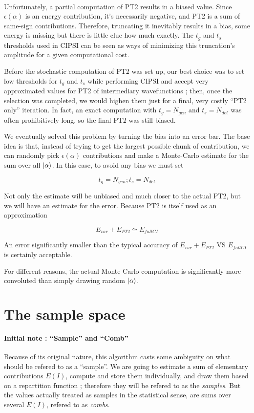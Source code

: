 \documentclass[./thesis.tex]{subfiles}
\begin{document}
\paragraph{}

Unfortunately, a partial computation of PT2 results in a biased value. Since $\epsilon(\alpha)$ is an energy contribution, it's necessarily negative, and PT2 is a sum of same-sign contributions. Therefore, truncating it inevitably results in a bias, some energy is missing but there is little clue how much exactly. The $t_g$ and $t_s$ thresholds used in CIPSI can be seen as ways of minimizing this truncation's amplitude for a given computational cost.

Before the stochastic computation of PT2 was set up, our best choice was to set low thresholds for $t_g$ and $t_s$ while performing CIPSI and accept very approximated values for PT2 of intermediary wavefunctions ; then, once the selection was completed, we would highen them just for a final, very costly ``PT2 only'' iteration. In fact, an exact computation with $t_g=N_{gen}$ and $t_s=N_{det}$ was often prohibitively long, so the final PT2 was still biased. 


We eventually solved this problem by turning the bias into an error bar. The base idea is that, instead of trying to get the largest possible chunk of contribution, we can randomly pick $\epsilon(\alpha)$ contributions and make a Monte-Carlo estimate for the sum over all $\ket \alpha$. In this case, to avoid any bias we must set

$$t_g = N_{gen} ; t_s = N_{det}$$

Not only the estimate will be unbiased and much closer to the actual PT2, but we will have an estimate for the error. Because PT2 is itself used as an approximation

$$E_{var} + E_{PT2} \simeq E_{fullCI}$$

An error significantly smaller than the typical accuracy of $E_{var} + E_{PT2}$ VS $E_{fullCI}$ is certainly acceptable.


For different reasons, the actual Monte-Carlo computation is significantly more convoluted than simply drawing random $\ket \alpha$.


\section{The sample space}


\paragraph{Initial note : ``Sample'' and ``Comb''}
Because of its original nature, this algorithm casts some ambiguity on what should be refered to as a ``sample''. We are going to estimate a sum of elementary contributions $E(I)$, compute and store them individually, and draw them based on a repartition function ; therefore they will be refered to as the \emph{samples}. But the values actually treated as samples in the statistical sense, are sums over several $E(I)$, refered to as \emph{combs}.
\end{document}
